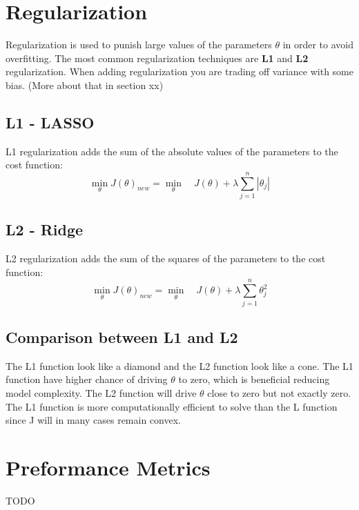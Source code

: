 \section{Regularization}
Regularization is used to punish large values of the parameters $\theta$ in order to avoid overfitting. The most common regularization techniques are \textbf{L1} and \textbf{L2} regularization. When adding regularization you are trading off variance with some bias. (More about that in section xx) \newline

\subsection{L1 - LASSO}
L1 regularization adds the sum of the absolute values of the parameters to the cost function:
\begin{equation}
    \min_{\theta} J(\theta)_{new} = \min_{\theta} \quad J(\theta) + \lambda \sum_{j=1}^{n} |\theta_j|
\end{equation}


\subsection{L2 - Ridge}
L2 regularization adds the sum of the squares of the parameters to the cost function:
\begin{equation}
    \min_{\theta} J(\theta)_{new} = \min_{\theta} \quad J(\theta) + \lambda \sum_{j=1}^{n} \theta_j^2
\end{equation}

\subsection{Comparison between L1 and L2}
The L1 function look like a diamond and the L2 function look like a cone. The L1 function have higher chance of driving $\theta$ to zero, which is beneficial reducing model complexity. The L2 function will drive $\theta$ close to zero but not exactly zero. The L1 function is more computationally efficient to solve than the L function since J will in many cases remain convex.

\section{Preformance Metrics}
TODO

